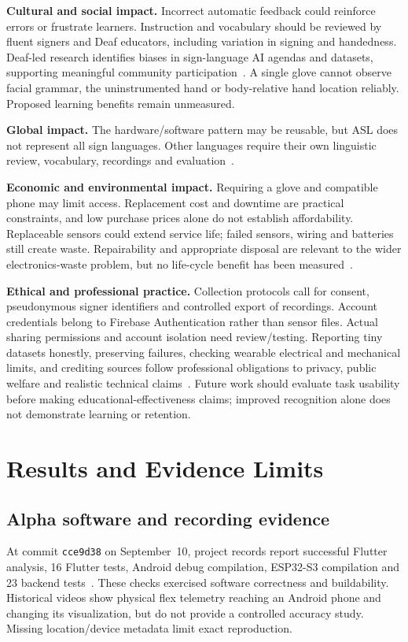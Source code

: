 \documentclass[11pt,letterpaper]{article}
\begin{document}
\textbf{Cultural and social impact.} Incorrect automatic feedback could reinforce
errors or frustrate learners. Instruction and vocabulary should be reviewed by
fluent signers and Deaf educators, including variation in signing and handedness.
Deaf-led research identifies biases in sign-language AI agendas and datasets,
supporting meaningful community participation~\cite{deafled}. A single glove
cannot observe facial grammar, the uninstrumented hand or body-relative hand
location reliably. Proposed learning benefits remain unmeasured.

\textbf{Global impact.} The hardware/software pattern may be reusable, but ASL
does not represent all sign languages. Other languages require their own
linguistic review, vocabulary, recordings and evaluation~\cite{nidcd}.

\textbf{Economic and environmental impact.} Requiring a glove and compatible
phone may limit access. Replacement cost and downtime are practical constraints,
and low purchase prices alone do not establish affordability. Replaceable
sensors could extend service life; failed sensors, wiring and batteries still
create waste. Repairability and appropriate disposal are relevant to the wider
electronics-waste problem, but no life-cycle benefit has been measured~\cite{ewaste}.

\textbf{Ethical and professional practice.} Collection protocols call for
consent, pseudonymous signer identifiers and controlled export of recordings.
Account credentials belong to Firebase Authentication rather than sensor files.
Actual sharing permissions and account isolation need review/testing. Reporting
tiny datasets honestly, preserving failures, checking wearable electrical and
mechanical limits, and crediting sources follow professional obligations to
privacy, public welfare and realistic technical claims~\cite{ethics}. Future
work should evaluate task usability before making educational-effectiveness
claims; improved recognition alone does not demonstrate learning or retention.

\section{Results and Evidence Limits}
\subsection{Alpha software and recording evidence}
At commit \texttt{cce9d38} on September~10, project records report successful
Flutter analysis, 16 Flutter tests, Android debug compilation, ESP32-S3 compilation
and 23 backend tests~\cite{repo}. These checks exercised software correctness
and buildability. Historical videos show physical flex telemetry reaching an
Android phone and changing its visualization, but do not provide a controlled
accuracy study. Missing location/device metadata limit exact reproduction.
\end{document}
